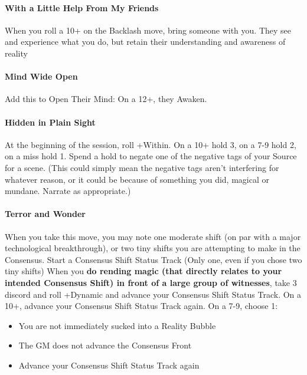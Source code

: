\documentclass[
]{memoir}
\begin{document}
\hypertarget{with-a-little-help-from-my-friends}{%
\paragraph{With a Little Help From My
Friends}\label{with-a-little-help-from-my-friends}}

When you roll a 10+ on the Backlash move, bring someone with you. They
see and experience what you do, but retain their understanding and
awareness of reality

\hypertarget{mind-wide-open}{%
\paragraph{Mind Wide Open}\label{mind-wide-open}}

Add this to Open Their Mind: On a 12+, they Awaken.

\hypertarget{hidden-in-plain-sight}{%
\paragraph{Hidden in Plain Sight}\label{hidden-in-plain-sight}}

At the beginning of the session, roll +Within. On a 10+ hold 3, on a 7-9
hold 2, on a miss hold 1. Spend a hold to negate one of the negative
tags of your Source for a scene. (This could simply mean the negative
tags aren't interfering for whatever reason, or it could be because of
something you did, magical or mundane. Narrate as appropriate.)

\hypertarget{terror-and-wonder}{%
\paragraph{Terror and Wonder}\label{terror-and-wonder}}

When you take this move, you may note one moderate shift (on par with a
major technological breakthrough), or two tiny shifts you are attempting
to make in the Consensus. Start a Consensus Shift Status Track (Only
one, even if you chose two tiny shifts) When you \textbf{do rending
magic (that directly relates to your intended Consensus Shift) in front
of a large group of witnesses}, take 3 discord and roll +Dynamic and
advance your Consensus Shift Status Track. On a 10+, advance your
Consensus Shift Status Track again. On a 7-9, choose 1:

\begin{itemize}
\item
  You are not immediately sucked into a Reality Bubble
\item
  The GM does not advance the Consensus Front
\item
  Advance your Consensus Shift Status Track again
\end{itemize}
\end{document}
